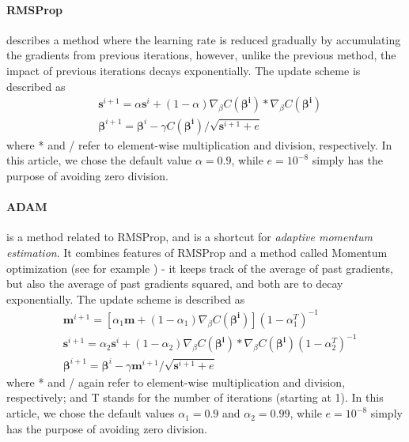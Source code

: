 \documentclass[11pt,a4paper,titlepage]{article}
\begin{document}
\paragraph*{RMSProp} describes a method where the learning rate is reduced gradually by accumulating the gradients from previous iterations, however, unlike the previous method, the impact of previous iterations decays exponentially. The update scheme is described as 
\begin{equation}
\begin{split}
    &\bm{s}^{i+1}=\alpha \bm{s}^{i}+(1-\alpha) \nabla_\beta C(\bm{\beta^{i}})* \nabla_\beta C(\bm{\beta^{i}}) \\
   &\bm{\beta}^{i+1}=\bm{\beta}^{i}-\gamma C(\bm{\beta^{i}}) / \sqrt{\bm{s}^{i+1}+e}
\end{split}
\end{equation}
where * and / refer to element-wise multiplication and division, respectively. In this article, we chose the default value $\alpha=0.9$, while $e=10^{-8}$ simply has the purpose of avoiding zero division.
\paragraph*{ADAM} is a method related to RMSProp, and is a shortcut for \textit{adaptive momentum estimation}. It combines features of RMSProp and a method called Momentum optimization (see for example \citep{MortenLectureNotes}) - it keeps track of the average of past gradients, but also the average of past gradients squared, and both are to decay exponentially. The update scheme is described as 
\begin{equation}
\begin{split}
    & \bm{m}^{i+1}=[\alpha_1\bm{m}+(1-\alpha_1) \nabla_\beta C(\bm{\beta^{i}})](1-\alpha_1^T)^{-1}\\
    &\bm{s}^{i+1}=\alpha_2 \bm{s}^{i}+(1-\alpha_2) \nabla_\beta C(\bm{\beta^{i}})* \nabla_\beta C(\bm{\beta^{i}})(1-\alpha_2^T)^{-1} \\
   &\bm{\beta}^{i+1}=\bm{\beta}^{i}-\gamma\bm{m}^{i+1} / \sqrt{\bm{s}^{i+1}+e}
\end{split}
\end{equation}
where * and /  again refer to element-wise multiplication and division, respectively; and T stands for the number of iterations (starting at 1). In this article, we chose the default values $\alpha_1=0.9$ and $\alpha_2=0.99$, while $e=10^{-8}$ simply has the purpose of avoiding zero division.
\end{document}
